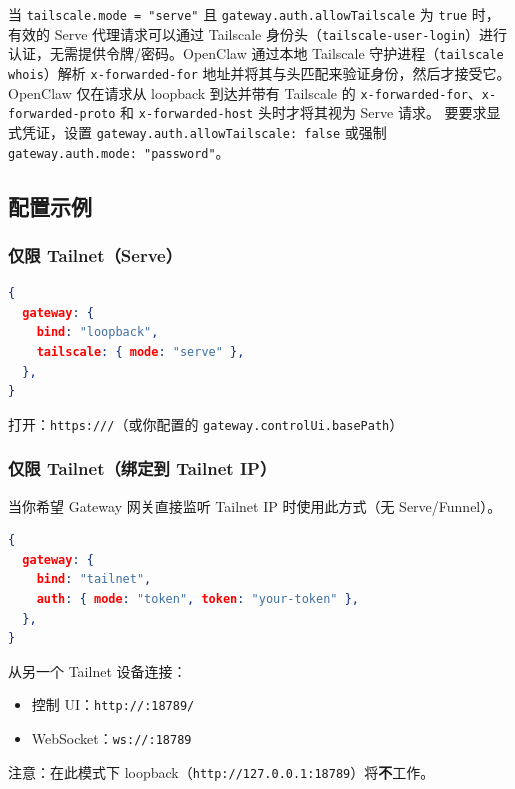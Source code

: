 当 \texttt{tailscale.mode = "serve"} 且 \texttt{gateway.auth.allowTailscale} 为 \texttt{true} 时，
有效的 Serve 代理请求可以通过 Tailscale 身份头（\texttt{tailscale-user-login}）进行认证，无需提供令牌/密码。OpenClaw 通过本地 Tailscale 守护进程（\texttt{tailscale whois}）解析 \texttt{x-forwarded-for} 地址并将其与头匹配来验证身份，然后才接受它。
OpenClaw 仅在请求从 loopback 到达并带有 Tailscale 的 \texttt{x-forwarded-for}、\texttt{x-forwarded-proto} 和 \texttt{x-forwarded-host} 头时才将其视为 Serve 请求。
要要求显式凭证，设置 \texttt{gateway.auth.allowTailscale: false} 或强制 \texttt{gateway.auth.mode: "password"}。

\subsection{配置示例}


\subsubsection{仅限 Tailnet（Serve）}


\begin{lstlisting}[language=json]
{
  gateway: {
    bind: "loopback",
    tailscale: { mode: "serve" },
  },
}
\end{lstlisting}


打开：\texttt{https:///}（或你配置的 \texttt{gateway.controlUi.basePath}）

\subsubsection{仅限 Tailnet（绑定到 Tailnet IP）}


当你希望 Gateway 网关直接监听 Tailnet IP 时使用此方式（无 Serve/Funnel）。

\begin{lstlisting}[language=json]
{
  gateway: {
    bind: "tailnet",
    auth: { mode: "token", token: "your-token" },
  },
}
\end{lstlisting}


从另一个 Tailnet 设备连接：

\begin{itemize}
  \item 控制 UI：\texttt{http://:18789/}
  \item WebSocket：\texttt{ws://:18789}
\end{itemize}


注意：在此模式下 loopback（\texttt{http://127.0.0.1:18789}）将\textbf{不}工作。

